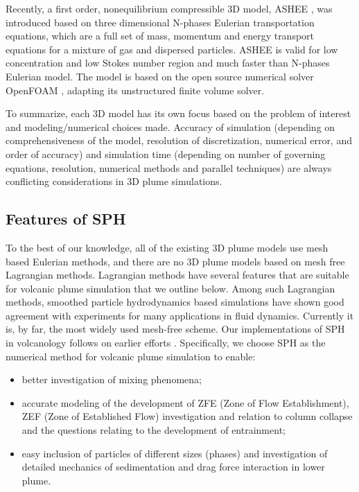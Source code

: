 \documentclass[gmd, manuscript]{copernicus}
\begin{document}
Recently, a first order, nonequilibrium compressible 3D model, ASHEE \citep{cerminara2016ashee}, was introduced based on three dimensional N-phases Eulerian transportation equations, which are a full set of mass, momentum and energy transport equations for a mixture of gas and dispersed particles. ASHEE is valid for low concentration and low Stokes number region and much faster than N-phases Eulerian model. The model is based on the open source numerical solver OpenFOAM \citep{weller1998tensorial}, adapting its unstructured finite volume solver.

To summarize, each 3D model has its own focus based on the problem of interest and modeling/numerical choices made. 
Accuracy of simulation (depending on comprehensiveness of the model, resolution of discretization, numerical error, and order of accuracy) and simulation time (depending on number of governing equations, resolution, numerical methods and parallel techniques) are always conflicting considerations in 3D plume simulations.

\subsection{Features of SPH}
To the best of our knowledge, all of the existing 3D plume models use mesh based Eulerian methods, and there are no 3D plume models based on mesh free Lagrangian methods. Lagrangian methods have several features that are suitable for volcanic plume simulation that we outline below. Among such Lagrangian methods, smoothed particle hydrodynamics \citep{gingold1977smoothed,lucy1977numerical} based simulations have shown good agreement with experiments for many applications in fluid dynamics. Currently it is, by far, the most widely used mesh-free scheme. Our implementations of SPH in volcanology follows on earlier efforts   \citep{bursik2003smoothed,herault2010sph,haddad2016smoothed}.
Specifically, we choose SPH as the numerical method for volcanic plume simulation to enable:
\begin{itemize}
\item better investigation of mixing phenomena;
\item accurate modeling of the development of ZFE (Zone of Flow Establishment), ZEF (Zone of Established Flow) investigation and relation to column collapse and the questions relating to the development of entrainment;
\item  easy inclusion of particles of different sizes (phases) and investigation of detailed mechanics of sedimentation and drag force interaction in lower plume.
\end{itemize}
\end{document}
